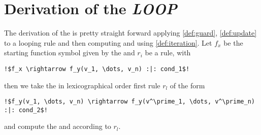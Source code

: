 \section{Derivation of the \emph{LOOP}}

The derivation of the \loopt is pretty straight forward applying \autoref{def:guard}, \autoref{def:update} to a looping rule and then computing \iterationmatrix and \iterationconstants using \autoref{def:iteration}. \newline
Let $f_x$ be the starting function symbol given by the \its and $r_i$ be a rule, with 
\begin{lstlisting}[escapechar=!]
	!$f_x \rightarrow f_y(v_1, \dots, v_n) :|: cond_1$!
\end{lstlisting} 
then we take the in lexicographical order first rule $r_l$ of the form 
\begin{lstlisting}[escapechar=!]
	!$f_y(v_1, \dots, v_n) \rightarrow f_y(v^\prime_1, \dots, v^\prime_n) :|: cond_2$!
\end{lstlisting}
and compute the \iterationmatrix and \iterationconstants according to $r_l$. 

